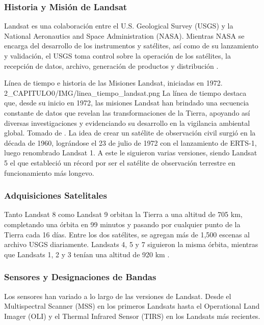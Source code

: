             \subsubsection{Historia y Misión de Landsat}
                Landsat es una colaboración entre el U.S. Geological Survey (USGS) y la National Aeronautics and Space Administration (NASA). Mientras NASA se encarga del desarrollo de los instrumentos y satélites, así como de su lanzamiento y validación, el USGS toma control sobre la operación de los satélites, la recepción de datos, archivo, generación de productos y distribución \autocite{USGS2023}.
                
                \insertfigure
                    {Línea de tiempo e historia de las Misiones Landsat, iniciadas en 1972.}
                    {2_CAPITULO0/IMG/linea_tiempo_landsat.png}
                    {La línea de tiempo destaca que, desde su inicio en 1972, las misiones Landsat han brindado una secuencia constante de datos que revelan las transformaciones de la Tierra, apoyando así diversas investigaciones y evidenciando su desarrollo en la vigilancia ambiental global. Tomado de \textcite{USGS2023}.} 
                La idea de crear un satélite de observación civil surgió en la década de 1960, lográndose el 23 de julio de 1972 con el lanzamiento de ERTS-1, luego renombrado Landsat 1. A este le siguieron varias versiones, siendo Landsat 5 el que estableció un récord por ser el satélite de observación terrestre en funcionamiento más longevo.
            
            \subsubsection{Adquisiciones Satelitales}
                Tanto Landsat 8 como Landsat 9 orbitan la Tierra a una altitud de 705 km, completando una órbita en 99 minutos y pasando por cualquier punto de la Tierra cada 16 días. Entre los dos satélites, se agregan más de 1,500 escenas al archivo USGS diariamente. Landsats 4, 5 y 7 siguieron la misma órbita, mientras que Landsats 1, 2 y 3 tenían una altitud de 920 km \autocite{USGS2023}.
            
            \subsubsection{Sensores y Designaciones de Bandas}
                Los sensores han variado a lo largo de las versiones de Landsat. Desde el Multispectral Scanner (MSS) en los primeros Landsats hasta el Operational Land Imager (OLI) y el Thermal Infrared Sensor (TIRS) en los Landsats más recientes.
            
